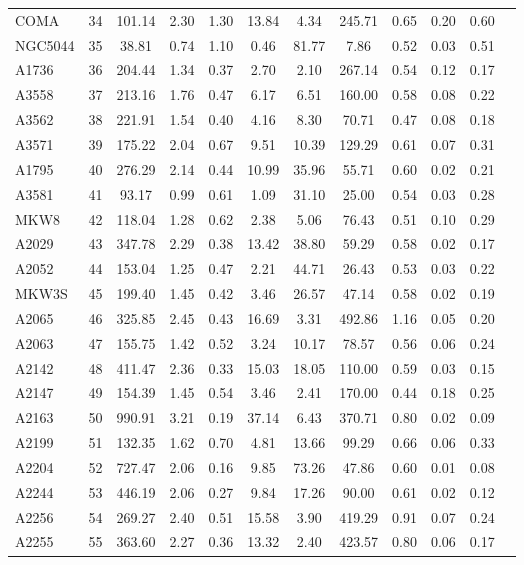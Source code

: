 \documentclass[10pt,aps,pra,reprint,amsmath,amsfonts,amssymb,showpacs,nofootinbib,floatfix]{revtex4-1}
\begin{document}
\begin{table}
\begin{minipage}{2.0\columnwidth}
\begin{tabular}{l  c c c c c c c c c c c}
$$COMA     &  34 & 101.14 &   2.30 &   1.30 &  13.84 &   4.34 & 245.71 &   0.65 &   0.20 &   0.60 \\
NGC5044  &  35 &  38.81 &   0.74 &   1.10 &   0.46 &  81.77 &   7.86 &   0.52 &   0.03 &   0.51 \\
A1736    &  36 & 204.44 &   1.34 &   0.37 &   2.70 &   2.10 & 267.14 &   0.54 &   0.12 &   0.17 \\
A3558    &  37 & 213.16 &   1.76 &   0.47 &   6.17 &   6.51 & 160.00 &   0.58 &   0.08 &   0.22 \\
A3562    &  38 & 221.91 &   1.54 &   0.40 &   4.16 &   8.30 &  70.71 &   0.47 &   0.08 &   0.18 \\
A3571    &  39 & 175.22 &   2.04 &   0.67 &   9.51 &  10.39 & 129.29 &   0.61 &   0.07 &   0.31 \\
A1795    &  40 & 276.29 &   2.14 &   0.44 &  10.99 &  35.96 &  55.71 &   0.60 &   0.02 &   0.21 \\
A3581    &  41 &  93.17 &   0.99 &   0.61 &   1.09 &  31.10 &  25.00 &   0.54 &   0.03 &   0.28 \\
MKW8     &  42 & 118.04 &   1.28 &   0.62 &   2.38 &   5.06 &  76.43 &   0.51 &   0.10 &   0.29 \\
A2029    &  43 & 347.78 &   2.29 &   0.38 &  13.42 &  38.80 &  59.29 &   0.58 &   0.02 &   0.17 \\
A2052    &  44 & 153.04 &   1.25 &   0.47 &   2.21 &  44.71 &  26.43 &   0.53 &   0.03 &   0.22 \\
MKW3S    &  45 & 199.40 &   1.45 &   0.42 &   3.46 &  26.57 &  47.14 &   0.58 &   0.02 &   0.19 \\
A2065    &  46 & 325.85 &   2.45 &   0.43 &  16.69 &   3.31 & 492.86 &   1.16 &   0.05 &   0.20 \\
A2063    &  47 & 155.75 &   1.42 &   0.52 &   3.24 &  10.17 &  78.57 &   0.56 &   0.06 &   0.24 \\
A2142    &  48 & 411.47 &   2.36 &   0.33 &  15.03 &  18.05 & 110.00 &   0.59 &   0.03 &   0.15 \\
A2147    &  49 & 154.39 &   1.45 &   0.54 &   3.46 &   2.41 & 170.00 &   0.44 &   0.18 &   0.25 \\
A2163    &  50 & 990.91 &   3.21 &   0.19 &  37.14 &   6.43 & 370.71 &   0.80 &   0.02 &   0.09 \\
A2199    &  51 & 132.35 &   1.62 &   0.70 &   4.81 &  13.66 &  99.29 &   0.66 &   0.06 &   0.33 \\
A2204    &  52 & 727.47 &   2.06 &   0.16 &   9.85 &  73.26 &  47.86 &   0.60 &   0.01 &   0.08 \\
A2244    &  53 & 446.19 &   2.06 &   0.27 &   9.84 &  17.26 &  90.00 &   0.61 &   0.02 &   0.12 \\
A2256    &  54 & 269.27 &   2.40 &   0.51 &  15.58 &   3.90 & 419.29 &   0.91 &   0.07 &   0.24 \\
A2255    &  55 & 363.60 &   2.27 &   0.36 &  13.32 &   2.40 & 423.57 &   0.80 &   0.06 &   0.17 \\
\end{tabular}
 \label{tab:flux_tab_CLp}
\end{minipage}
\end{table} 
\end{document}
